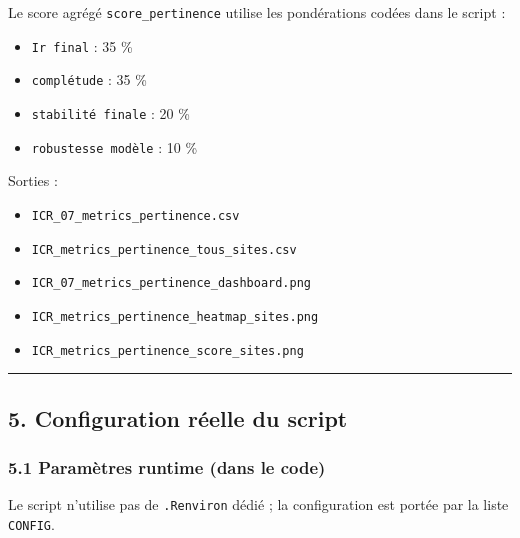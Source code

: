 Le score agrégé \texttt{score\_pertinence} utilise les pondérations
codées dans le script :

\begin{itemize}
\tightlist
\item
  \texttt{Ir\ final} : 35 \%
\item
  \texttt{complétude} : 35 \%
\item
  \texttt{stabilité\ finale} : 20 \%
\item
  \texttt{robustesse\ modèle} : 10 \%
\end{itemize}

Sorties :

\begin{itemize}
\tightlist
\item
  \texttt{ICR\_07\_metrics\_pertinence.csv}
\item
  \texttt{ICR\_metrics\_pertinence\_tous\_sites.csv}
\item
  \texttt{ICR\_07\_metrics\_pertinence\_dashboard.png}
\item
  \texttt{ICR\_metrics\_pertinence\_heatmap\_sites.png}
\item
  \texttt{ICR\_metrics\_pertinence\_score\_sites.png}
\end{itemize}

\begin{center}\rule{0.5\linewidth}{0.5pt}\end{center}

\subsection{5. Configuration réelle du
script}\label{configuration-ruxe9elle-du-script}

\subsubsection{5.1 Paramètres runtime (dans le
code)}\label{paramuxe8tres-runtime-dans-le-code}

Le script n'utilise pas de \texttt{.Renviron} dédié ; la configuration
est portée par la liste \texttt{CONFIG}.

